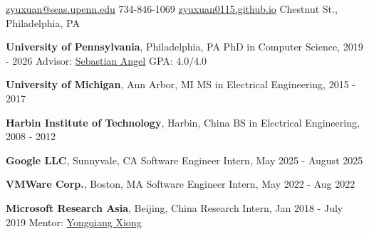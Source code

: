 \documentclass[10pt,a4paper]{article}
\begin{document}
\sloppy  %



\nobreakvspace{0.3em}  %

\noindent\href{mailto:zyuxuan.at.seas.dot.upenn.dot.edu}{zyuxuan\mbox{}@\mbox{}seas.upenn.edu}\sbull
\textsmaller {}734-846-1069\sbull
\href{https://zyuxuan0115.github.io}{zyuxuan0115.github.io} Chestnut St., Philadelphia, PA 


\headedsection
  {\textbf{University of Pennsylvania}, Philadelphia, PA}
  {\textsc{}} {%
  \headedsubsection
    {PhD in Computer Science, 2019 - 2026}
    {}{}
    \headedsubsection
    {Advisor: \href{https://www.cis.upenn.edu/~sga001/}{Sebastian Angel}}
    {}{}
    \headedsubsection
    {GPA: 4.0/4.0}
    {}{}
}

\headedsection
  {\textbf{University of Michigan}, Ann Arbor, MI}
  {\textsc{}} {%
  \headedsubsection
    {MS in Electrical Engineering, 2015 - 2017}
    {}{}
}

\headedsection
  {\textbf{Harbin Institute of Technology}, Harbin, China}
  {\textsc{}} {%
  \headedsubsection
    {BS in Electrical Engineering, 2008 - 2012}
    {} {}
}


\headedsection
  {\textbf{Google LLC}, Sunnyvale, CA}
  {\textsc{}} {%
  \headedsubsection
    {Software Engineer Intern, May 2025 - August 2025}
    {}{}
}

\headedsection
  {\textbf{VMWare Corp.}, Boston, MA}
  {\textsc{}} {%
  \headedsubsection
    {Software Engineer Intern, May 2022 - Aug 2022}
    {}{}
}

\headedsection
  {\textbf{Microsoft Research Asia}, Beijing, China}
  {\textsc{}} {%
  \headedsubsection
    {Research Intern, Jan 2018 - July 2019}
    {}{}
  \headedsubsection
    {Mentor: \href{https://www.microsoft.com/en-us/research/people/yqx/}{Yongqiang Xiong}}
    {}{}
}
\end{document}
